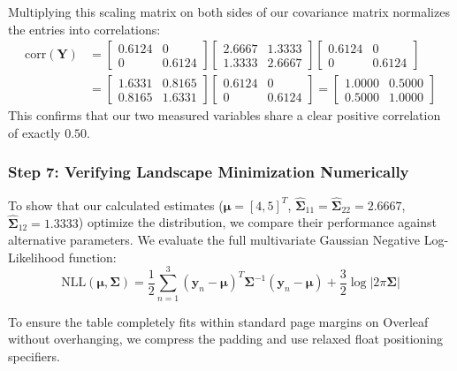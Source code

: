 \documentclass{article}
\begin{document}
Multiplying this scaling matrix on both sides of our covariance matrix normalizes the entries into correlations:
\begin{align*}
\text{corr}(\mathbf{Y}) &= \begin{bmatrix} 0.6124 & 0 \\ 0 & 0.6124 \end{bmatrix} \begin{bmatrix} 2.6667 & 1.3333 \\ 1.3333 & 2.6667 \end{bmatrix} \begin{bmatrix} 0.6124 & 0 \\ 0 & 0.6124 \end{bmatrix} \\
&= \begin{bmatrix} 1.6331 & 0.8165 \\ 0.8165 & 1.6331 \end{bmatrix} \begin{bmatrix} 0.6124 & 0 \\ 0 & 0.6124 \end{bmatrix} = \begin{bmatrix} \mathbf{1.0000} & \mathbf{0.5000} \\ \mathbf{0.5000} & \mathbf{1.0000} \end{bmatrix}
\end{align*}
This confirms that our two measured variables share a clear positive correlation of exactly $0.50$.

\subsubsection{Step 7: Verifying Landscape Minimization Numerically}

To show that our calculated estimates ($\hat{\boldsymbol{\mu}} = [4, 5]^T$, $\hat{\boldsymbol{\Sigma}}_{11}=\hat{\boldsymbol{\Sigma}}_{22}=2.6667$, $\hat{\boldsymbol{\Sigma}}_{12}=1.3333$) optimize the distribution, we compare their performance against alternative parameters. We evaluate the full multivariate Gaussian Negative Log-Likelihood function:
\begin{equation}
\text{NLL}(\boldsymbol{\mu}, \boldsymbol{\Sigma}) = \frac{1}{2}\sum_{n=1}^3 (\mathbf{y}_n - \boldsymbol{\mu})^T \boldsymbol{\Sigma}^{-1}(\mathbf{y}_n - \boldsymbol{\mu}) + \frac{3}{2}\log|2\pi\boldsymbol{\Sigma}|
\end{equation}

To ensure the table completely fits within standard page margins on Overleaf without overhanging, we compress the padding and use relaxed float positioning specifiers.
\end{document}
